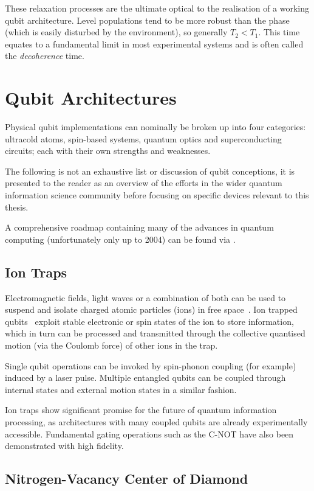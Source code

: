 These relaxation processes are the ultimate optical to the realisation of a working qubit architecture.
Level populations tend to be more robust than the phase (which is easily disturbed by the environment), so generally $T_2 < T_1$.
This time equates to a fundamental limit in most experimental systems and is often called the \textit{decoherence} time.

\section{Qubit Architectures}
Physical qubit implementations can nominally be broken up into four categories: ultracold atoms, spin-based systems, quantum optics and superconducting circuits; each with their own strengths and weaknesses.

The following is not an exhaustive list or discussion of qubit conceptions, it is presented to the reader as an overview of the efforts in the wider quantum information science community before focusing on specific devices relevant to this thesis.

A comprehensive roadmap containing many of the advances in quantum computing (unfortunately only up to 2004) can be found via .

\subsection{Ion Traps}
Electromagnetic fields, light waves or a combination of both can be used to suspend and isolate charged atomic particles (ions) in free space~\cite{Paul1990}.
Ion trapped qubits~\cite{Cirac1995} exploit stable electronic or spin states of the ion to store information, which in turn can be processed and transmitted through the collective quantised motion (via the Coulomb force) of other ions in the trap.

Single qubit operations can be invoked by spin-phonon coupling (for example) induced by a laser pulse.
Multiple entangled qubits can be coupled through internal states and external motion states in a similar fashion.

Ion traps show significant promise for the future of quantum information processing, as architectures with many coupled qubits are already experimentally accessible.
Fundamental gating operations such as the C-NOT have also been demonstrated with high fidelity.

\subsection{Nitrogen-Vacancy Center of Diamond}

